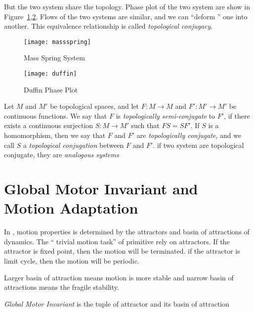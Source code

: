 But the two system share the topology. 
Phase plot of the two system are show in Figure~\ref{fig:msphaseplot},\ref{fig:duffin}.
Flows of the two systems are similar, and we can ``deform '' one into another.
This equivalence relationship is called \emph{topological conjugacy}.

\begin{figure}
\begin{center}
\texttt{[image: massspring]}
\end{center}
\caption{Mass Spring System}
\label{fig:msphaseplot}
\end{figure}

\begin{figure}
\begin{center}
\texttt{[image: duffin]}
\end{center}
\caption{Duffin Phase Plot}
\label{fig:duffin}
\end{figure}



\begin{mydef}
Let $M$ and $M'$ be topological spaces, and let $F\colon M\to M$ and $F'\colon M'\to M'$
be continuous functions. We say that $F$ is
\emph{topologically semi-conjugate} to $F'$, if there exists a continuous
surjection $S\colon M\to M'$ such that $FS=SF'$. If $S$ is a homomorphism,
then we say that $F$ and $F'$ are \emph{topologically conjugate}, and we call
$S$ a \emph{topological conjugation} between $F$ and $F'$.
if two system are topological conjugate, they are \emph{analogous systems}
\end{mydef}




\section{Global Motor Invariant and Motion Adaptation}
\label{sec:GMIandMA}
In \moit,  motion properties is determined by the attractors and basin of attractions of dynamics.
The `` trivial motion task'' of primitive rely on attractors.
If the attractor is fixed point, then the motion will be terminated.
if the attractor is limit cycle, then the motion will be periodic.

Larger basin of attraction means motion is more stable and narrow basin of attractions means the fragile stability.

\begin{mydef}
\emph{Global Motor Invariant} is the tuple of attractor and its basin of attraction
\end{mydef}


